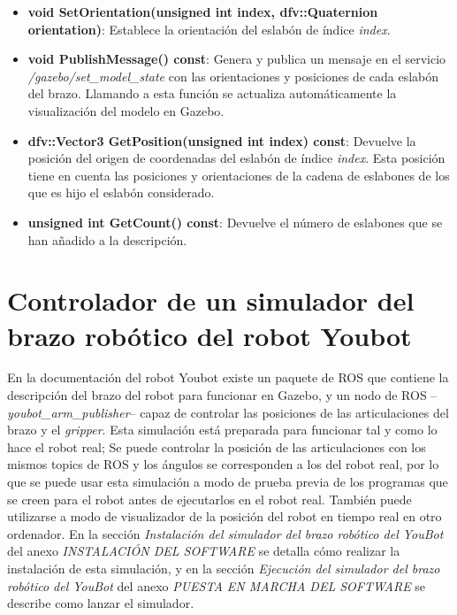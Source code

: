 \documentclass[12pt, a4paper]{report}
\begin{document}
\begin{itemize}
\item \textbf{void SetOrientation(unsigned int index, dfv::Quaternion orientation)}: Establece la orientación del eslabón de índice \textit{index}.

\item \textbf{void PublishMessage() const}: Genera y publica un mensaje en el servicio \textit{/gazebo/set\_model\_state} con las orientaciones y posiciones de cada eslabón del brazo. Llamando a esta función se actualiza automáticamente la visualización del modelo en Gazebo.

\item \textbf{dfv::Vector3 GetPosition(unsigned int index) const}: Devuelve la posición del origen de coordenadas del eslabón de índice \textit{index}. Esta posición tiene en cuenta las posiciones y orientaciones de la cadena de eslabones de los que es hijo el eslabón considerado.

\item \textbf{unsigned int GetCount() const}: Devuelve el número de eslabones que se han añadido a la descripción.

\end{itemize}

\lstset{inputencoding=utf8/latin1}


\section{Controlador de un simulador del brazo robótico del robot Youbot}

En la documentación del robot Youbot existe un paquete de ROS que contiene la descripción del brazo del robot para funcionar en Gazebo, y un nodo de ROS --\textit{youbot\_arm\_publisher}-- capaz de controlar las posiciones de las articulaciones del brazo y el \textit{gripper}. Esta simulación está preparada para funcionar tal y como lo hace el robot real; Se puede controlar la posición de las articulaciones con los mismos topics de ROS y los ángulos se corresponden a los del robot real, por lo que se puede usar esta simulación a modo de prueba previa de los programas que se creen para el robot antes de ejecutarlos en el robot real. También puede utilizarse a modo de visualizador de la posición del robot en tiempo real en otro ordenador. En la sección \textit{Instalación del simulador del brazo robótico del YouBot} del anexo \textit{INSTALACIÓN DEL SOFTWARE} se detalla cómo realizar la instalación de esta simulación, y en la sección \textit{Ejecución del simulador del brazo robótico del YouBot} del anexo \textit{PUESTA EN MARCHA DEL SOFTWARE} se describe como lanzar el simulador.
\end{document}
